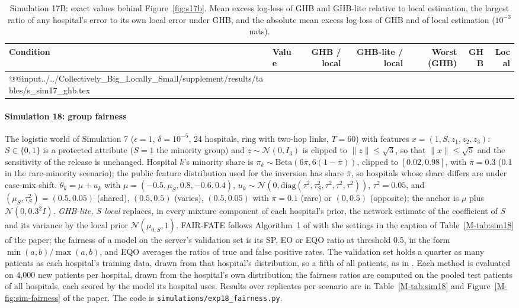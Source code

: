\documentclass[acmsmall,screen,nonacm]{acmart}
\theoremstyle{acmdefinition}
\begin{document}
\begin{table}[t]
\caption{Simulation 17B: exact values behind Figure~\ref{fig:s17b}. Mean excess log-loss of GHB and GHB-lite relative to local estimation, the largest ratio of any hospital's error to its own local error under GHB, and the absolute mean excess log-loss of GHB and of local estimation ($10^{-3}$ nats).}
\label{tab:s17b}
\scriptsize
\begin{tabular}{@{}llrrrrr@{}}
\toprule
Condition & Value & GHB / local & GHB-lite / local & Worst (GHB) & GHB & Local\\
\midrule
\csname @@input\endcsname../../Collectively_Big_Locally_Small/supplement/results/tables/s_sim17_ghb.tex 
\bottomrule
\end{tabular}
\end{table}

\paragraph{Simulation 18: group fairness} The logistic world of Simulation 7 ($\epsilon=1$, $\delta=10^{-5}$, 24 hospitals, ring with two-hop links, $T=60$) with features $x=(1,S,z_1,z_2,z_3)$: $S\in\{0,1\}$ is a protected attribute ($S=1$ the minority group) and $z\sim\mathcal{N}(0,I_3)$ is clipped to $\|z\|\le\sqrt{3}$, so that $\|x\|\le\sqrt{5}$ and the sensitivity of the release is unchanged. Hospital $k$'s minority share is $\pi_k\sim\mathrm{Beta}(6\bar\pi,6(1-\bar\pi))$, clipped to $[0.02,0.98]$, with $\bar\pi=0.3$ (0.1 in the rare-minority scenario); the public feature distribution used for the inversion has share $\bar\pi$, so hospitals whose share differs are under case-mix shift. $\theta_k=\mu+u_k$ with $\mu=(-0.5,\mu_S,0.8,-0.6,0.4)$, $u_k\sim\mathcal{N}(0,\mathrm{diag}(\tau^2,\tau_S^2,\tau^2,\tau^2,\tau^2))$, $\tau^2=0.05$, and $(\mu_S,\tau_S^2)=(0.5,0.05)$ (shared), $(0.5,0.5)$ (varies), $(0.5,0.05)$ with $\bar\pi=0.1$ (rare) or $(0,0.5)$ (opposite); the anchor is $\mu$ plus $\mathcal{N}(0,0.3^2I)$. \emph{GHB-lite, $S$ local} replaces, in every mixture component of each hospital's prior, the network estimate of the coefficient of $S$ and its variance by the local prior $\mathcal{N}(\mu_{0,S},1)$. FAIR-FATE follows Algorithm~1 of \cite{salazar2023fairfate} with the settings in the caption of Table~\ref{M-tab:sim18} of the paper; the fairness of a model on the server's validation set is its SP, EO or EQO ratio at threshold 0.5, in the form $\min(a,b)/\max(a,b)$, and EQO averages the ratios of true and false positive rates. The validation set holds a quarter as many patients as each hospital's training data, drawn from that hospital's distribution, so a fifth of all patients, as in \cite{salazar2023fairfate}. Each method is evaluated on 4,000 new patients per hospital, drawn from the hospital's own distribution; the fairness ratios are computed on the pooled test patients of all hospitals, each scored by the model its hospital uses. Results over \SimEighteenReps{} replicates per scenario are in Table~\ref{M-tab:sim18} and Figure~\ref{M-fig:sim-fairness} of the paper. The code is \texttt{simulations/exp18\_fairness.py}.
\end{document}
